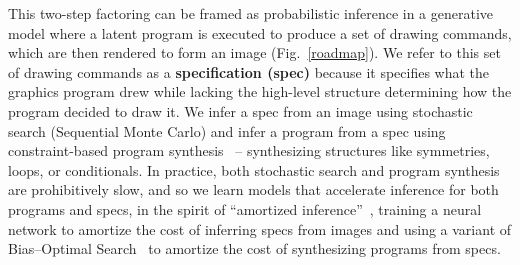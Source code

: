 \documentclass{article}
\theoremstyle{definition}
\begin{document}
This two-step factoring can be framed as probabilistic inference in a generative model where a latent program
 is executed to produce a set of drawing commands,
 which are then rendered to form an image (Fig.~\ref{roadmap}).
 We refer to this set of drawing commands as a \textbf{specification (spec)} because it specifies what the graphics program drew while lacking the high-level structure determining how the program decided to draw it.
 We infer a spec from an image using stochastic search (Sequential Monte Carlo)
 and infer a program from a spec using  constraint-based program synthesis~\citep{solar2008program} --
 synthesizing structures like symmetries, loops, or conditionals.
 In practice, both stochastic search and program synthesis are
 prohibitively slow,
 and so we learn models that accelerate inference for both programs and specs,
 in the spirit of ``amortized inference''~\cite{paige2016inference},
 training a neural network to amortize the cost of inferring specs from images and using
 a variant of Bias--Optimal Search~\cite{schmidhuber2004optimal}
 to amortize the cost of synthesizing programs from specs.
\end{document}
